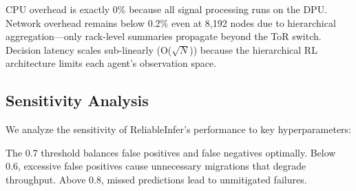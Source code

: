 \documentclass[conference,10pt,letterpaper]{IEEEtran}
\begin{document}
CPU overhead is exactly 0\% because all signal processing runs on the DPU. Network overhead remains below 0.2\% even at 8,192 nodes due to hierarchical aggregation---only rack-level summaries propagate beyond the ToR switch. Decision latency scales sub-linearly (O($\sqrt{N}$)) because the hierarchical RL architecture limits each agent's observation space.


\subsection{Sensitivity Analysis}

We analyze the sensitivity of ReliableInfer's performance to key hyperparameters:

\begin{table}[!t]
\caption{Sensitivity to Prediction Confidence Threshold}
\label{tab:sensitivity}
\centering\scriptsize
{}
\end{table}

The 0.7 threshold balances false positives and false negatives optimally. Below 0.6, excessive false positives cause unnecessary migrations that degrade throughput. Above 0.8, missed predictions lead to unmitigated failures.
\end{document}
